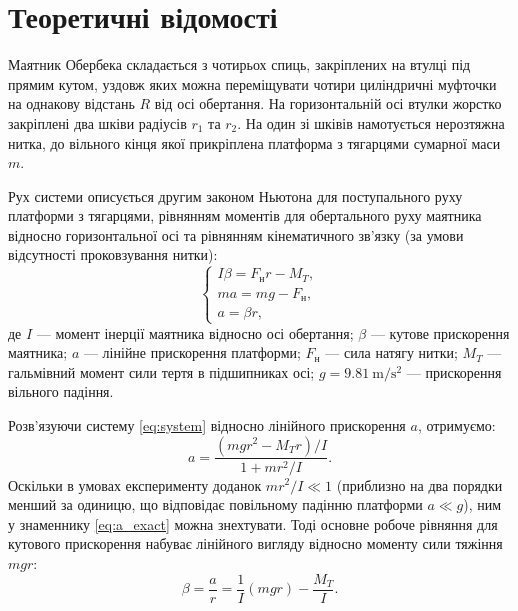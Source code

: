 \documentclass[ukrainian]{ucaphyslab}
\begin{document}
\section{Теоретичні відомості}
Маятник Обербека складається з чотирьох спиць, закріплених на втулці під прямим кутом, уздовж яких можна переміщувати чотири циліндричні муфточки на однакову відстань $R$ від осі обертання. На горизонтальній осі втулки жорстко закріплені два шківи радіусів $r_1$ та $r_2$. На один зі шківів намотується нерозтяжна нитка, до вільного кінця якої прикріплена платформа з тягарцями сумарної маси $m$.

Рух системи описується другим законом Ньютона для поступального руху платформи з тягарцями, рівнянням моментів для обертального руху маятника відносно горизонтальної осі та рівнянням кінематичного зв'язку (за умови відсутності проковзування нитки):
\begin{equation}
  \begin{cases}
    I\beta = F_{\text{н}}r - M_T, \\
    ma = mg - F_{\text{н}}, \\
    a = \beta r,
  \end{cases}
  \label{eq:system}
\end{equation}
де $I$ — момент інерції маятника відносно осі обертання; $\beta$ — кутове прискорення маятника; $a$ — лінійне прискорення платформи; $F_{\text{н}}$ — сила натягу нитки; $M_T$ — гальмівний момент сили тертя в підшипниках осі; $g = \SI{9.81}{\meter\per\second\squared}$ — прискорення вільного падіння.

Розв'язуючи систему \eqref{eq:system} відносно лінійного прискорення $a$, отримуємо:
\begin{equation}
  a = \frac{(mgr^2 - M_T r)/I}{1 + mr^2/I}.
  \label{eq:a_exact}
\end{equation}
Оскільки в умовах експерименту доданок $mr^2/I \ll 1$ (приблизно на два порядки менший за одиницю, що відповідає повільному падінню платформи $a \ll g$), ним у знаменнику \eqref{eq:a_exact} можна знехтувати. Тоді основне робоче рівняння для кутового прискорення набуває лінійного вигляду відносно моменту сили тяжіння $mgr$:
\begin{equation}
  \beta = \frac{a}{r} = \frac{1}{I}(mgr) - \frac{M_T}{I}.
  \label{eq:beta_linear}
\end{equation}
\end{document}

